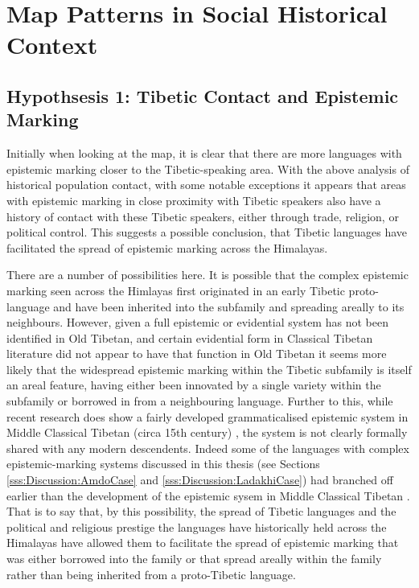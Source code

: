 \section{Map Patterns in Social Historical Context}\label{s:History:Correlations}
\subsection{Hypothsesis 1: Tibetic Contact and Epistemic Marking}
Initially when looking at the map, it is clear that there are more languages with epistemic marking closer to the Tibetic-speaking area. With the above analysis of historical population contact, with some notable exceptions it appears that areas with epistemic marking in close proximity with Tibetic speakers also have a history of contact with these Tibetic speakers, either through trade, religion, or political control. This suggests a possible conclusion, that Tibetic languages have facilitated the spread of epistemic marking across the Himalayas. 

There are a number of possibilities here. It is possible that the complex epistemic marking seen across the Himlayas first originated in an early Tibetic proto-language and have been inherited into the subfamily and spreading areally to its neighbours. However, given a full epistemic or evidential system has not been identified in Old Tibetan, and certain evidential form in Classical Tibetan literature did not appear to have that function in Old Tibetan \cite{Hill2014} it seems more likely that the widespread epistemic marking within the Tibetic subfamily is itself an areal feature, having either been innovated by a single variety within the subfamily or borrowed in from a neighbouring language. Further to this, while recent research does show a fairly developed grammaticalised epistemic system in Middle Classical Tibetan (circa 15th century) \cite{Oisel2024}, the system is not clearly formally shared with any modern descendents. Indeed some of the languages with complex epistemic-marking systems discussed in this thesis (see Sections \ref{sss:Discussion:AmdoCase} and \ref{sss:Discussion:LadakhiCase}) had branched off earlier than the development of the epistemic sysem in Middle Classical Tibetan \cite{Bialek2018}. That is to say that, by this possibility, the spread of Tibetic languages and the political and religious prestige the languages have historically held across the Himalayas have allowed them to facilitate the spread of epistemic marking that was either borrowed into the family or that spread areally within the family rather than being inherited from a proto-Tibetic language.

